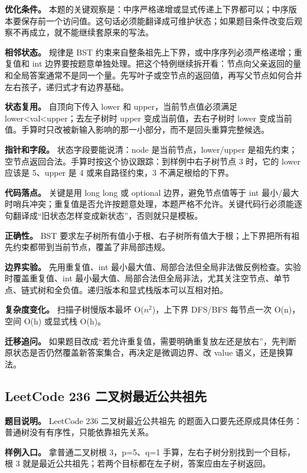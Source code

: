 \textbf{优化条件。} 本题的关键观察是：中序严格递增或显式传递上下界都可以；中序版本要保存前一个访问值。这句话必须能翻译成可维护状态；如果题目条件改变后观察不再成立，就不能继续套原来的写法。

\textbf{相邻状态。} 规律是 BST 约束来自整条祖先上下界，或中序序列必须严格递增；重复值和 int 边界要按题意单独处理。把这个特例继续拆开看：节点向父亲返回的量和全局答案通常不是同一个量。先写叶子或空节点的返回值，再写父节点如何合并左右孩子，递归式才有边界基础。

\textbf{状态复用。} 自顶向下传入 lower 和 upper，当前节点值必须满足 lower<val<upper；去左子树时 upper 变成当前值，去右子树时 lower 变成当前值。手算时只改被新输入影响的那一小部分，而不是回头重算完整候选。

\textbf{指针和字段。} 状态字段要能说清：node 是当前节点，lower/upper 是祖先约束；空节点返回合法。手算时按这个协议跟踪：到样例中右子树节点 3 时，它的 lower 应该是 5、upper 是 4 或来自路径约束，3 不满足根给的下界。

\textbf{代码落点。} 关键是用 long long 或 optional 边界，避免节点值等于 int 最小/最大时哨兵冲突；重复值是否允许按题意处理，本题严格不允许。关键代码行必须能逐句翻译成“旧状态怎样变成新状态”，否则就只是模板。

\textbf{正确性。} BST 要求左子树所有值小于根、右子树所有值大于根；上下界把所有祖先约束都带到当前节点，覆盖了非局部违规。

\textbf{边界实验。} 先用重复值、int 最小最大值、局部合法但全局非法做反例检查。实验时覆盖重复值、int 最小最大值、局部合法但全局非法，尤其关注空节点、单节点、链式树和全负值。递归版本和显式栈版本可以互相对拍。

\textbf{复杂度变化。} 扫描子树慢版本最坏 O(\ensuremath{n^{2}})，上下界 DFS/BFS 每节点一次 O(n)，空间 O(h) 或显式栈 O(h)。

\textbf{迁移追问。} 如果题目改成“若允许重复值，需要明确重复放左还是放右”，先判断原状态是否仍然覆盖新答案集合，再决定是微调边界、改 value 语义，还是换算法。

\subsection{LeetCode 236 二叉树最近公共祖先}

\textbf{题目说明。} LeetCode 236 二叉树最近公共祖先 的题面入口要先还原成具体任务：普通树没有有序性，只能依靠祖先关系。

\textbf{样例入口。} 拿普通二叉树根 3，p=5、q=1 手算，左右子树分别找到一个目标，根 3 就是最近公共祖先；若两个目标都在左子树，答案应由左子树返回。

